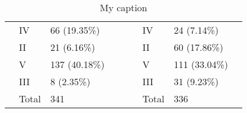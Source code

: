 \begin{table}[]
{\begin{tabular}{|l|l|l|l|l|l|l|l|l|}
 & IV & 66 (19.35\%) &  &  &  & IV & 24 (7.14\%) &  \\ \cline{2-3} \cline{7-8}
 & II & 21 (6.16\%) &  &  &  & II & 60 (17.86\%) &  \\ \cline{2-3} \cline{7-8}
 & V & 137 (40.18\%) &  &  &  & V & 111 (33.04\%) &  \\ \cline{2-3} \cline{7-8}
 & III & 8 (2.35\%) &  &  &  & III & 31 (9.23\%) &  \\ \cline{2-3} \cline{7-8}
 & Total & 341 &  &  &  & Total & 336 &  \\ \cline{1-4} \cline{6-9}
\end{tabular}
}
\caption{My caption}
\label{my-label}
\end{table}



\newpage
